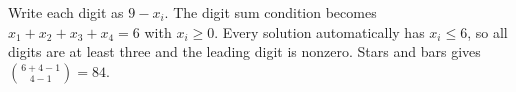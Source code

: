 Write each digit as $9-x_i$. The digit sum condition becomes $x_1+x_2+x_3+x_4=6$ with $x_i\ge0$. Every solution automatically has $x_i\le6$, so all digits are at least three and the leading digit is nonzero. Stars and bars gives $\binom{6+4-1}{4-1}=\boxed{84}$.
